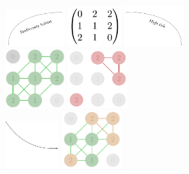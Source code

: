 \begin{figure}
    \centering
    \includegraphics[width = 0.2\textwidth]{figures/wildland/arrow_biod2.PNG}
    \includegraphics[width = 0.18\textwidth]{figures/wildland/land3.PNG}
    \includegraphics[width = 0.2\textwidth]{figures/wildland/arrow_fuel2.PNG}
    \\
    \includegraphics[width=0.2\textwidth]{figures/wildland/biodiv_3.PNG} \hspace*{4cm}
    \includegraphics[width=0.2\textwidth]{figures/wildland/fire_3.PNG}\\
    \includegraphics[width=0.18\textwidth]{figures/wildland/arrow_right.PNG}
    \includegraphics[width = 0.2\textwidth]{figures/wildland/graphe_feu_biod_33.PNG}

\end{figure}
